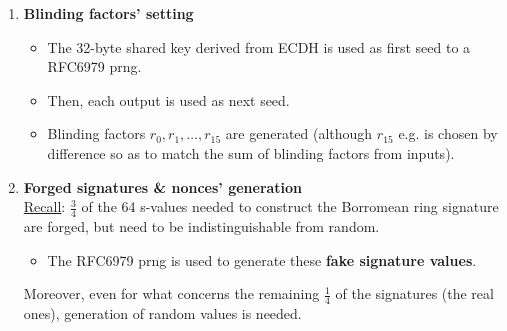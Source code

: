 \documentclass[10.5pt,compress]{beamer}
\begin{document}
\begin{frame}[allowframebreaks]
    \begin{enumerate}
        \item \textbf{Blinding factors' setting}
        \begin{itemize}
            \item The 32-byte shared key derived from ECDH is used as first seed to a RFC6979 prng.
            \item Then, each output is used as next seed.
            \item Blinding factors $r_0, r_1, \dots, r_{15}$ are generated (although $r_{15}$ e.g. is chosen by difference so as to match the sum of blinding factors from inputs).
        \end{itemize}
        \item \textbf{Forged signatures \& nonces' generation}\\
        \underline{Recall}: $\frac{3}{4}$ of the 64 s-values needed to construct the Borromean ring signature are forged, but need to be indistinguishable from random.
        \begin{itemize}
            \item The RFC6979 prng is used to generate these \textbf{fake signature values}.
        \end{itemize}
        Moreover, even for what concerns the remaining $\frac{1}{4}$ of the signatures (the real ones), generation of random values is needed.

\end{enumerate}
\end{frame}
\end{document}
